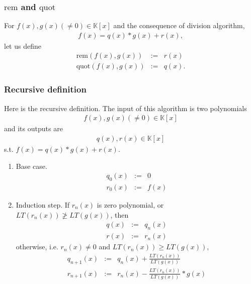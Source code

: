 \documentclass[11pt]{book}
\begin{document}
\subsubsection{$\text{rem}$ and $\text{quot}$}
For $f(x), g(x)(\neq 0) \in \mathbb{K}[x]$ and the consequence of division algorithm,
\begin{eqnarray}
f(x) = q(x) * g(x) + r(x),
\end{eqnarray}
let us define
\begin{eqnarray}
\text{rem}\left( f(x), g(x) \right) &:=& r(x) \\
\text{quot}\left( f(x), g(x) \right) &:=& q(x).
\end{eqnarray}

\subsubsection{Recursive definition}
Here is the recursive definition.
The input of this algorithm is two polynomials
\begin{eqnarray}
f(x), g(x)(\neq 0) \in \mathbb{K}[x]
\end{eqnarray}
and its outputs are
\begin{eqnarray}
q(x), r(x) \in \mathbb{K}[x]
\end{eqnarray}
s.t. $f(x) = q(x) * g(x) + r(x)$.

\begin{enumerate}
\item Base case.
\begin{eqnarray}
q_0(x) &:=& 0 \\
r_0(x) &:=& f(x)
\end{eqnarray}

\item Induction step.
If $r_n(x)$ is zero polynomial, or $LT\left(r_n(x) \right) \not\geq LT\left( g(x)\right)$,
then
\begin{eqnarray}
q(x) &:=& q_n(x) \\
r(x) &:=& r_n(x)
\end{eqnarray}
otherwise, i.e. $r_n(x) \neq 0$ and $LT\left(r_n(x) \right) \geq LT\left( g(x)\right)$,
\begin{eqnarray}
q_{n+1}(x) &:=& q_n(x) + \frac{LT\left( r_n(x) \right)}{LT\left( g(x) \right)} \\
r_{n+1}(x) &:=& r_n(x) - \frac{LT\left( r_n(x) \right)}{LT\left( g(x) \right)}*g(x) 
\end{eqnarray}

\end{enumerate}
\end{document}
